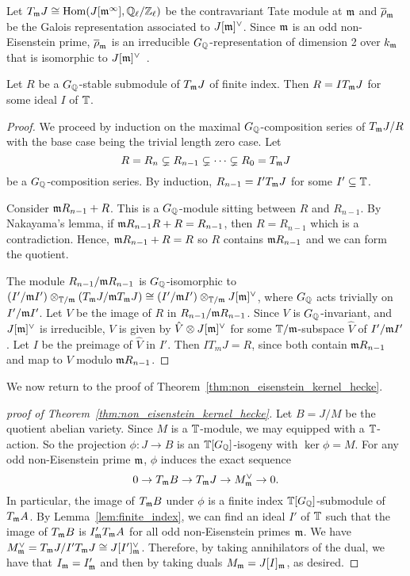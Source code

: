\documentclass[thesis.tex]{subfiles}
\begin{document}
Let $T_{\mathfrak{m}} J\cong \operatorname{Hom}(J[\mathfrak{m}^\infty], \mathbb{Q}_\ell/\mathbb{Z}_\ell)$ be the contravariant
Tate module at $\mathfrak{m}$ and $\overline{\rho}_{\mathfrak{m}}$ be the Galois representation
associated to $J[\mathfrak{m}]^\vee$. Since $\mathfrak{m}$ is an odd non-Eisenstein prime,
$\overline{\rho}_{\mathfrak{m}}$ is an irreducible $G_{\mathbb{Q}}$-representation of dimension 2
over $k_{\mathfrak{m}}$ that is isomorphic to $J[\mathfrak{m}]^\vee$~\cite[Prop.
14.2]{mazur:eisenstein}.

\begin{lemma}\label{lem:finite_index}
    Let $R$ be a $G_{\mathbb{Q}}$-stable submodule of $T_{\mathfrak{m}} J$ of finite index. Then
    $R=IT_{\mathfrak{m}} J$ for some ideal $I$ of $\mathbb{T}$.
\end{lemma}
\begin{proof}
    We proceed by induction on the maximal $G_{\mathbb{Q}}$-composition series of $T_{\mathfrak{m}} J/R$
    with the base case being the trivial length zero case. Let
    \[
        R = R_n \subsetneq R_{n-1} \subsetneq \cdots \subsetneq R_0 = T_{\mathfrak{m}} J
    \]
    be a $G_{\mathbb{Q}}$-composition series. By induction, $R_{n-1} = I'T_{\mathfrak{m}} J$ for some
    $I'\subseteq \mathbb{T}$.

    Consider $\mathfrak{m} R_{n-1} + R$. This is a $G_{\mathbb{Q}}$-module sitting between $R$ and
    $R_{n-1}$. By Nakayama's lemma, if $\mathfrak{m} R_{n-1} R + R = R_{n-1}$, then
    $R=R_{n-1}$ which is a contradiction. Hence, $\mathfrak{m} R_{n-1}+R=R$ so $R$
    contains $\mathfrak{m} R_{n-1}$ and we can form the quotient.

    The module $R_{n-1}/\mathfrak{m} R_{n-1}$ is $G_{\mathbb{Q}}$-isomorphic to $(I'/\mathfrak{m}
    I')\otimes_{\mathbb{T}/\mathfrak{m}} (T_{\mathfrak{m}} J/\mathfrak{m} T_{\mathfrak{m}} J) \cong (I'/\mathfrak{m} I')\otimes_{\mathbb{T}/\mathfrak{m}}
    J[\mathfrak{m}]^\vee$, where $G_{\mathbb{Q}}$ acts trivially on $I'/\mathfrak{m} I'$. Let $V$ be the image
    of $R$ in $R_{n-1}/\mathfrak{m} R_{n-1}$. Since $V$ is $G_{\mathbb{Q}}$-invariant, and
    $J[\mathfrak{m}]^\vee$ is irreducible, $V$ is given by $\hat{V}\otimes J[\mathfrak{m}]^\vee$
    for some $\mathbb{T}/\mathfrak{m}$-subspace $\hat{V}$ of $I'/\mathfrak{m} I'$. Let $I$ be the preimage
    of $\hat{V}$ in $I'$. Then $IT_m J = R$, since both contain $\mathfrak{m} R_{n-1}$
    and map to $V$ modulo $\mathfrak{m} R_{n-1}$.
\end{proof}

We now return to the proof of Theorem~\ref{thm:non_eisenstein_kernel_hecke}.

\begin{proof}[proof of Theorem~\ref{thm:non_eisenstein_kernel_hecke}]
    Let $B=J/M$ be the quotient abelian variety. Since $M$ is a $\mathbb{T}$-module,
    we may equipped with a $\mathbb{T}$-action. So the projection $\phi:J \to B$ is an
    $\mathbb{T}[G_{\mathbb{Q}}]$-isogeny with $\ker\phi = M$. For any odd non-Eisenstein prime
    $\mathfrak{m}$, $\phi$ induces the exact sequence
    \[
        0 \to T_{\mathfrak{m}} B \to T_{\mathfrak{m}} J \to M^\vee _{\mathfrak{m}} \to 0.
    \]
    In particular, the image of $T_{\mathfrak{m}} B$ under $\phi$ is a finite index
    $\mathbb{T}[G_{\mathbb{Q}}]$-submodule of $T_{\mathfrak{m}} A$. By Lemma~\ref{lem:finite_index}, we can find
    an ideal $I'$ of $\mathbb{T}$ such that the image of $T_{\mathfrak{m}} B$ is $I' _{\mathfrak{m}} T_{\mathfrak{m}} A$
    for all odd non-Eisenstein primes $\mathfrak{m}$. We have $M^\vee _{\mathfrak{m}} = T_{\mathfrak{m}} J / I'
    T_{\mathfrak{m}} J\cong J[I']_{\mathfrak{m}} ^\vee$. Therefore, by taking annihilators of the dual,
    we have that $I_{\mathfrak{m}} = I'_{\mathfrak{m}}$ and then by taking duals $M_{\mathfrak{m}} = J[I]_{\mathfrak{m}}$, as
    desired.
\end{proof}
\end{document}
